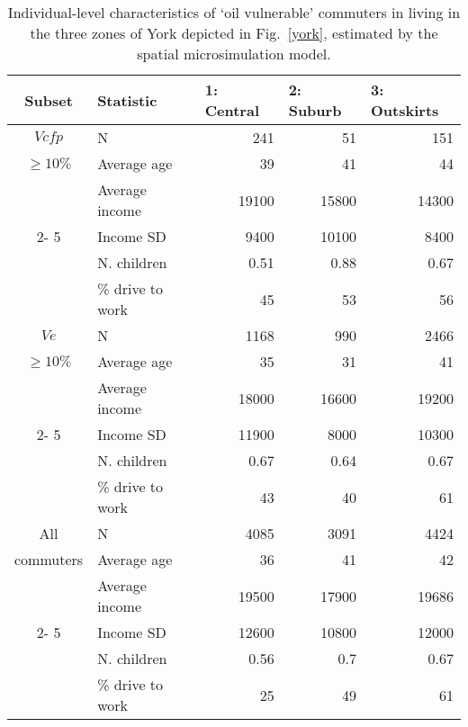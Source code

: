 \begin{table}[htbp]
\caption[Individual-level characteristics
of `oil vulnerable' commuters]{Individual-level characteristics
of `oil vulnerable' commuters in living in the three zones of
York depicted in Fig.~\ref{york}, estimated by the spatial microsimulation
model.}
\begin{center}
\begin{tabular}{|c|l|r|r|r|}
\hline
Subset & Statistic & \multicolumn{1}{l|}{1: Central} & \multicolumn{1}{l|}{2:
Suburb} & \multicolumn{1}{l|}{3: Outskirts} \\ \hline
\multicolumn{ 1}{|c|}{$V{cfp}$} & N & 241 & 51 & 151 \\ \cline{ 2- 5}
\multicolumn{ 1}{|c|}{$\geq 10\%$} & Average age & 39 & 41 & 44 \\ \cline{ 2- 5}
\multicolumn{ 1}{|c|}{} & Average income & 19100 & 15800 & 14300 \\ \cline{ 2-
5}
\multicolumn{ 1}{|c|}{} & Income SD & 9400 & 10100 & 8400 \\ \cline{ 2- 5}
\multicolumn{ 1}{|c|}{} & N. children & 0.51 & 0.88 & 0.67 \\ \cline{ 2- 5}
\multicolumn{ 1}{|c|}{} & \% drive to work & 45 & 53 & 56 \\ \hline
\multicolumn{ 1}{|c|}{$V{e}$} & N & 1168 & 990 & 2466 \\ \cline{ 2- 5}
\multicolumn{ 1}{|c|}{$\geq 10\%$} & Average age & 35 & 31 & 41 \\ \cline{ 2- 5}
\multicolumn{ 1}{|c|}{} & Average income & 18000 & 16600 & 19200 \\ \cline{ 2-
5}
\multicolumn{ 1}{|c|}{} & Income SD & 11900 & 8000 & 10300 \\ \cline{ 2- 5}
\multicolumn{ 1}{|c|}{} & N. children & 0.67 & 0.64 & 0.67 \\ \cline{ 2- 5}
\multicolumn{ 1}{|c|}{} & \% drive to work & 43 & 40 & 61 \\ \hline
\multicolumn{ 1}{|c|}{All } & N & 4085 & 3091 & 4424 \\ \cline{ 2- 5}
\multicolumn{ 1}{|c|}{commuters} & Average age & 36 & 41 & 42 \\ \cline{ 2- 5}
\multicolumn{ 1}{|c|}{} & Average income & 19500 & 17900 & 19686 \\ \cline{ 2-
5}
\multicolumn{ 1}{|c|}{} & Income SD & 12600 & 10800 & 12000 \\ \cline{ 2- 5}
\multicolumn{ 1}{|c|}{} & N. children & 0.56 & 0.7 & 0.67 \\ \cline{ 2- 5}
\multicolumn{ 1}{|c|}{} & \% drive to work & 25 & 49 & 61 \\ \hline
\end{tabular}\end{center}
\label{t:ind2}
\end{table}

